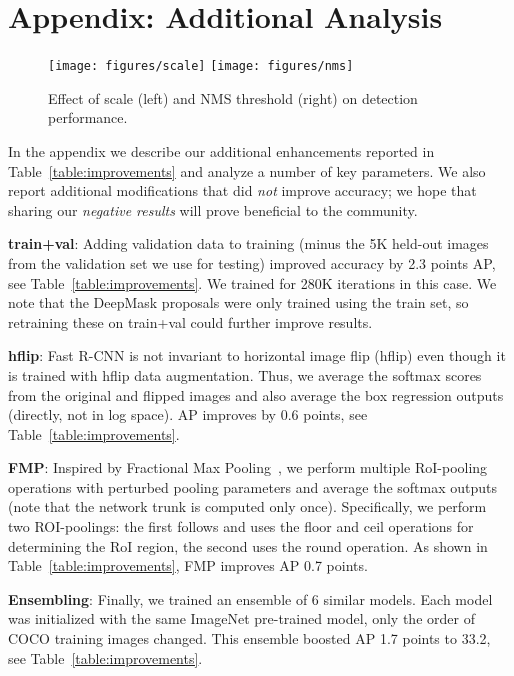 \documentclass{bmvc2k}
\newcommand{\Caption}[1]{\caption{\small#1}}
\newcommand{\tab}[1]{Table~\ref{table:#1}}
\begin{document}
\section*{Appendix: Additional Analysis}\label{sec:appendix}

\begin{figure}[t]\centering
 \texttt{[image: figures/scale]}
 \texttt{[image: figures/nms]}
\Caption{Effect of scale (left) and NMS threshold (right) on detection performance.\vspace{-3mm}}
\label{fig:scale+nms}
\end{figure}


In the appendix we describe our additional enhancements reported in \tab{improvements} and analyze a number of key parameters. We also report additional modifications that did \emph{not} improve accuracy; we hope that sharing our \emph{negative results} will prove beneficial to the community.

\textbf{train+val}: Adding validation data to training (minus the 5K held-out images from the validation set we use for testing) improved accuracy by 2.3 points AP, see \tab{improvements}. We trained for 280K iterations in this case. We note that the DeepMask proposals were only trained using the train set, so retraining these on train+val could further improve results.

\textbf{hflip}: Fast R-CNN is not invariant to horizontal image flip (hflip) even though it is trained with hflip data augmentation. Thus, we average the softmax scores from the original and flipped images and also average the box regression outputs (directly, not in log space). AP improves by 0.6 points, see \tab{improvements}.

\textbf{FMP}: Inspired by Fractional Max Pooling~\cite{fmp}, we perform multiple RoI-pooling operations with perturbed pooling parameters and average the softmax outputs (note that the network trunk is computed only once). Specifically, we perform two ROI-poolings: the first follows \cite{He2014sppNet} and uses the floor and ceil operations for determining the RoI region, the second uses the round operation. As shown in \tab{improvements}, FMP improves AP 0.7 points.

\textbf{Ensembling}: Finally, we trained an ensemble of 6 similar models. Each model was initialized with the same ImageNet pre-trained model, only the order of COCO training images changed. This ensemble boosted AP 1.7 points to 33.2, see \tab{improvements}.
\end{document}
